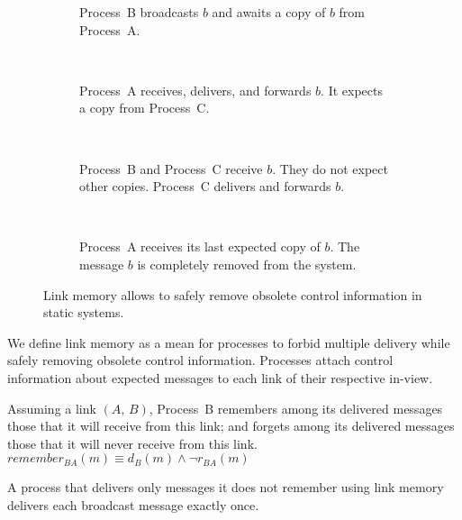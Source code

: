 \begin{figure*}[t]
  \begin{center}   
    \begin{subfigure}[t]{0.23\textwidth}
      \centering
      \caption{\label{fig:memorylinkA}Process~B broadcasts $b$ and awaits a copy
        of $b$ from Process~A.}
    \end{subfigure}
    ~
    \begin{subfigure}[t]{0.23\textwidth}
      \centering%
      \caption{\label{fig:memorylinkB}Process~A receives, delivers, and forwards
        $b$. It expects a copy from Process~C.}
    \end{subfigure}
    ~
    \begin{subfigure}[t]{0.23\textwidth}
      \centering%
      \caption{\label{fig:memorylinkC}Process~B and Process~C receive $b$. They
        do not expect other copies. Process~C delivers and forwards $b$.}
    \end{subfigure}
    ~
    \begin{subfigure}[t]{0.23\textwidth}
      \centering
      \caption{\label{fig:memorylinkD}Process~A receives its last expected copy
      of $b$. The message $b$ is completely removed from the system.}
    \end{subfigure}
    \caption{\label{fig:memorylink}Link memory allows to safely remove obsolete
      control information in static systems.}
  \end{center}
\end{figure*}


We define link memory as a mean for processes to forbid multiple delivery while
safely removing obsolete control information. Processes attach control
information about expected messages to each link of their respective in-view.


\begin{definition}
  Assuming a link $(A,\, B)$, Process~B remembers among its delivered messages
  those that it will receive from this link; and forgets among its delivered
  messages those that it will never receive from this link.
  $remember_{BA}(m) \equiv d_B(m) \wedge \neg r_{BA}(m)$
\end{definition}

\begin{theorem}
  A process that delivers only messages it does not remember using link memory
  delivers each broadcast message exactly once.
\end{theorem}


